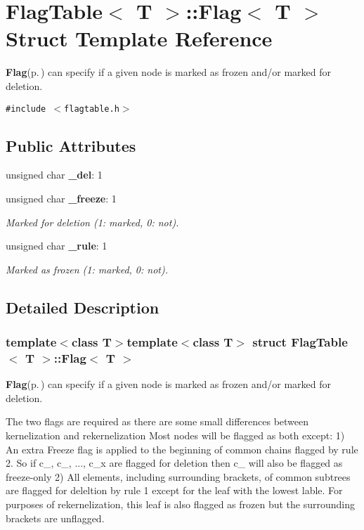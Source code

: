 \section{Flag\-Table$<$ T $>$::Flag$<$ T $>$ Struct Template Reference}
\label{structFlagTable_1_1Flag}
{\bf Flag}{\rm (p.\,\pageref{structFlagTable_1_1Flag})} can specify if a given node is marked as frozen and/or marked for deletion.  


{\tt \#include $<$flagtable.h$>$}

\subsection*{Public Attributes}
\begin{CompactItemize}
\item 
unsigned char {\bf \_\-del}: 1
\item 
unsigned char {\bf \_\-freeze}: 1
\begin{CompactList}\small\item\em Marked for deletion (1: marked, 0: not). \item\end{CompactList}\item 
unsigned char {\bf \_\-rule}: 1
\begin{CompactList}\small\item\em Marked as frozen (1: marked, 0: not). \item\end{CompactList}\end{CompactItemize}


\subsection{Detailed Description}
\subsubsection*{template$<$class T$>$template$<$class T$>$ struct Flag\-Table$<$ T $>$::Flag$<$ T $>$}

{\bf Flag}{\rm (p.\,\pageref{structFlagTable_1_1Flag})} can specify if a given node is marked as frozen and/or marked for deletion. 

The two flags are required as there are some small differences between kernelization and rekernelization Most nodes will be flagged as both except: 1) An extra Freeze flag is applied to the beginning of common chains flagged by rule 2. So if c\_, c\_, ..., c\_\-x are flagged for deletion then c\_ will also be flagged as freeze-only 2) All elements, including surrounding brackets, of common subtrees are flagged for deleltion by rule 1 except for the leaf with the lowest lable. For purposes of rekernelization, this leaf is also flagged as frozen but the surrounding brackets are unflagged. 



